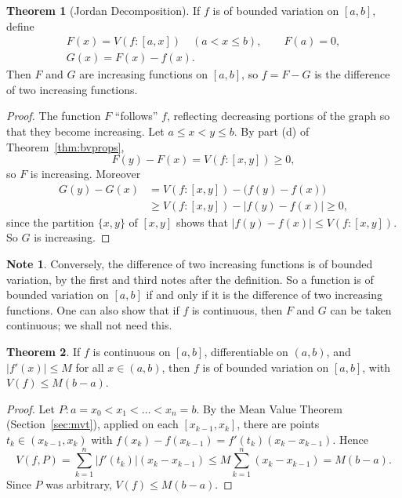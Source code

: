 \documentclass[11pt,a4paper]{article}
\numberwithin{equation}{section}
\theoremstyle{definition}
\newtheorem{thm}{Theorem}[subsection]
\newtheorem*{note}{Note}
\begin{document}
\begin{thm}[Jordan Decomposition]\label{thm:jordan}
If $f$ is of bounded variation on $[a,b]$, define
\begin{gather*}
F(x) = V(f: [a,x]) \quad (a< x\leq b),\qquad F(a) = 0,\\
G(x) = F(x) - f(x).
\end{gather*}
Then $F$ and $G$ are increasing functions on $[a,b]$, so $f = F - G$ is the difference of two increasing functions.
\end{thm}

\begin{proof}
The function $F$ ``follows'' $f$, reflecting decreasing portions of the graph so that they become increasing. Let $a\leq x < y\leq b$. By part (d) of Theorem~\ref{thm:bvprops},
$$F(y) - F(x) = V(f:[x,y]) \geq 0,$$
so $F$ is increasing. Moreover
\begin{align*}
G(y) - G(x) &= V(f: [x,y]) - \bigl(f(y) - f(x)\bigr)\\
&\geq V(f: [x, y]) - |f(y) - f(x)| \geq 0,
\end{align*}
since the partition $\{x,y\}$ of $[x,y]$ shows that $|f(y) - f(x)|\leq V(f:[x,y])$. So $G$ is increasing.
\end{proof}

\begin{note}
Conversely, the difference of two increasing functions is of bounded variation, by the first and third notes after the definition. So a function is of bounded variation on $[a,b]$ if and only if it is the difference of two increasing functions. One can also show that if $f$ is continuous, then $F$ and $G$ can be taken continuous; we shall not need this.
\end{note}


\begin{thm}\label{thm:bvderiv}
If $f$ is continuous on $[a,b]$, differentiable on $(a,b)$, and $|f'(x)|\leq M$ for all $x\in (a,b)$, then $f$ is of bounded variation on $[a,b]$, with $V(f)\leq M(b-a)$.
\end{thm}

\begin{proof}
Let $P: a = x_0<x_1<\dots<x_n = b$. By the Mean Value Theorem (Section~\ref{sec:mvt}), applied on each $[x_{k-1},x_k]$, there are points $t_k \in (x_{k-1}, x_k)$ with $f(x_k) - f(x_{k-1}) = f'(t_k) (x_k - x_{k-1})$. Hence
$$V(f,P) = \sum^n_{k = 1}|f'(t_k)| (x_k - x_{k - 1}) \leq M\sum^n_{k = 1} (x_k - x_{k - 1}) = M (b - a) .$$
Since $P$ was arbitrary, $V(f)\leq M(b-a)$.
\end{proof}
\end{document}
